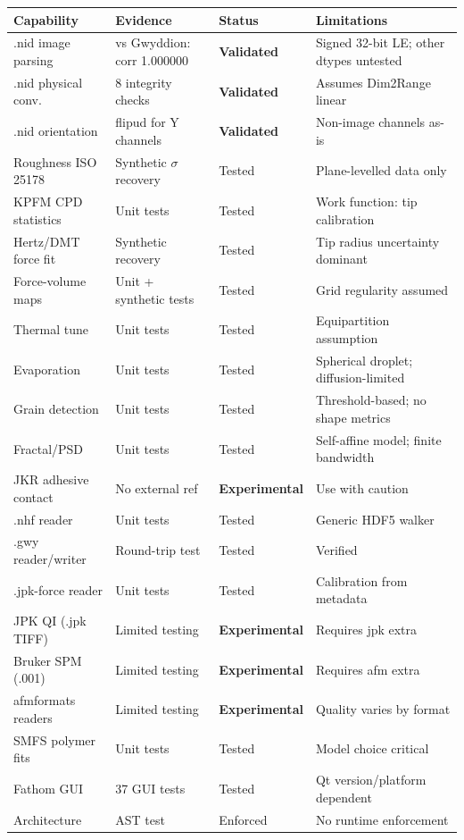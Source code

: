 \documentclass[a4paper,11pt]{article}
\begin{document}
\begin{longtable}{@{}p{3.3cm} p{2.8cm} p{1.8cm} p{3.5cm}@{}}
\toprule
Capability & Evidence & Status & Limitations \\
\midrule
.nid image parsing & vs Gwyddion: corr 1.000000 & \textbf{Validated} & Signed 32-bit LE; other dtypes untested \\
.nid physical conv. & 8 integrity checks & \textbf{Validated} & Assumes Dim2Range linear \\
.nid orientation & flipud for Y channels & \textbf{Validated} & Non-image channels as-is \\
Roughness ISO 25178 & Synthetic $\sigma$ recovery & Tested & Plane-levelled data only \\
KPFM CPD statistics & Unit tests & Tested & Work function: tip calibration \\
Hertz/DMT force fit & Synthetic recovery & Tested & Tip radius uncertainty dominant \\
Force-volume maps & Unit + synthetic tests & Tested & Grid regularity assumed \\
Thermal tune & Unit tests & Tested & Equipartition assumption \\
Evaporation & Unit tests & Tested & Spherical droplet; diffusion-limited \\
Grain detection & Unit tests & Tested & Threshold-based; no shape metrics \\
Fractal/PSD & Unit tests & Tested & Self-affine model; finite bandwidth \\
JKR adhesive contact & No external ref & \textbf{Experimental} & Use with caution \\
.nhf reader & Unit tests & Tested & Generic HDF5 walker \\
.gwy reader/writer & Round-trip test & Tested & Verified \\
.jpk-force reader & Unit tests & Tested & Calibration from metadata \\
JPK QI (.jpk TIFF) & Limited testing & \textbf{Experimental} & Requires jpk extra \\
Bruker SPM (.001) & Limited testing & \textbf{Experimental} & Requires afm extra \\
afmformats readers & Limited testing & \textbf{Experimental} & Quality varies by format \\
SMFS polymer fits & Unit tests & Tested & Model choice critical \\
Fathom GUI & 37 GUI tests & Tested & Qt version/platform dependent \\
Architecture & AST test & Enforced & No runtime enforcement \\
\bottomrule
\end{longtable}
\end{document}

